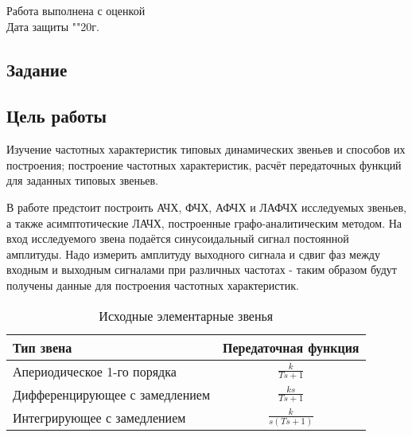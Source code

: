\documentclass[a4paper, 12pt]{article}
\begin{document}
\begin{titlepage}
		Работа выполнена с оценкой \hspace{1cm} \underline{\hspace{8cm}} \\ 
		\vspace{1cm}
		Дата защиты "\underline{\hspace{0.7cm}}"\hspace{0.2cm}\underline{\hspace{2cm}}\hspace{0.2cm}20\underline{\hspace{0.7cm}}г.

\end{titlepage}

\begin{center}
\section*{Задание}
\end{center}

\subsection*{Цель работы} 
\par
Изучение частотных характеристик типовых динамических звеньев и способов их построения; построение частотных характеристик, расчёт передаточных функций для заданных типовых звеньев.
\par
В работе предстоит построить АЧХ, ФЧХ, АФЧХ и ЛАФЧХ исследуемых звеньев, а также асимптотические ЛАЧХ, построенные графо-аналитическим методом. На вход исследуемого звена подаётся синусоидальный сигнал постоянной амплитуды. Надо измерить амплитуду выходного сигнала и сдвиг фаз между входным и выходным сигналами при различных частотах - таким образом будут получены данные для построения частотных характеристик. 

\begin{table}[h!]
    \centering
    \begin{threeparttable}
    	\caption{Исходные элементарные звенья}
    	\begin{tabular} {|l|c|}
        \hline
        	Тип звена & Передаточная функция \\ [0.5cm]  \hline
        	Апериодическое 1-го порядка & $\displaystyle\frac{k}{Ts + 1}$ \\ [0.5cm]  \hline
        	Дифференцирующее с замедлением & $\displaystyle\frac{ks}{Ts+1}$ \\ [0.5cm]  \hline
        	Интегрирующее с замедлением & $\displaystyle\frac{k}{s(Ts + 1)}$ \\ [0.5cm] \hline
    	\end{tabular}
    \end{threeparttable} 
\end{table}
\end{document}
